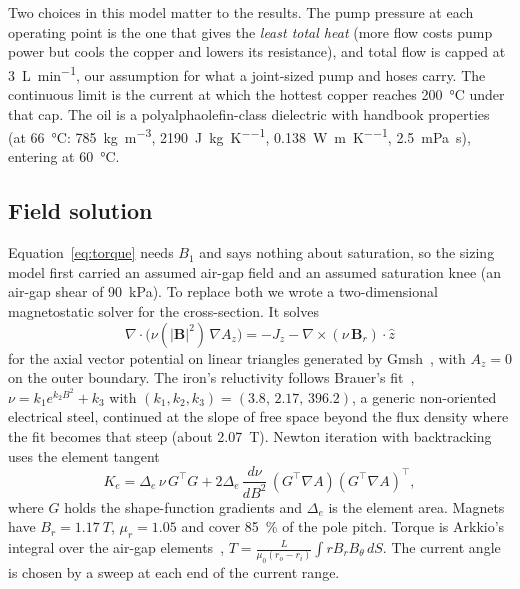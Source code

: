 \documentclass[11pt]{article}
\begin{document}
Two choices in this model matter to the results. The pump pressure at each
operating point is the one that gives the \emph{least total heat} (more flow
costs pump power but cools the copper and lowers its resistance), and total
flow is capped at \SI{3}{L\per\minute}, our assumption for what a joint-sized
pump and hoses carry. The continuous limit is the current at which the hottest
copper reaches \SI{200}{\celsius} under that cap. The oil is a
polyalphaolefin-class dielectric with handbook properties
(at \SI{66}{\celsius}: \SI{785}{kg\per\metre\cubed},
\SI{2190}{J\per\kg\per\kelvin}, \SI{0.138}{W\per\metre\per\kelvin},
\SI{2.5}{mPa.s}), entering at \SI{60}{\celsius}.

\subsection{Field solution}
\label{sec:fea}

Equation~\eqref{eq:torque} needs $B_1$ and says nothing about saturation, so the
sizing model first carried an assumed air-gap field and an assumed saturation
knee (an air-gap shear of \SI{90}{kPa}). To replace both we wrote a
two-dimensional magnetostatic solver for the cross-section. It solves
\begin{equation}
\nabla\cdot\bigl(\nu(|\mathbf B|^2)\,\nabla A_z\bigr) = -J_z - \nabla\times(\nu\,\mathbf B_r)\cdot\hat z
\end{equation}
for the axial vector potential on linear triangles generated by
Gmsh~\cite{geuzaine2009}, with $A_z=0$ on the outer boundary. The iron's
reluctivity follows Brauer's fit~\cite{brauer1975},
$\nu = k_1 e^{k_2 B^2} + k_3$ with $(k_1,k_2,k_3)=(3.8,\,2.17,\,396.2)$,
a generic non-oriented electrical steel, continued at the slope of free space
beyond the flux density where the fit becomes that steep (about
\SI{2.07}{T}). Newton iteration with backtracking uses the element tangent
\begin{equation}
K_e = \Delta_e\,\nu\,G^\top G + 2\Delta_e\,\frac{d\nu}{dB^2}\,
      (G^\top\nabla A)(G^\top\nabla A)^\top ,
\end{equation}
where $G$ holds the shape-function gradients and $\Delta_e$ is the element
area. Magnets have $B_r=\SI{1.17}{T}$, $\mu_r=1.05$ and cover
\SI{85}{\percent} of the pole pitch. Torque is Arkkio's integral over the
air-gap elements~\cite{arkkio1987},
$T = \tfrac{L}{\mu_0 (r_o-r_i)}\int r B_r B_\theta\,dS$. The current angle is
chosen by a sweep at each end of the current range.
\end{document}
